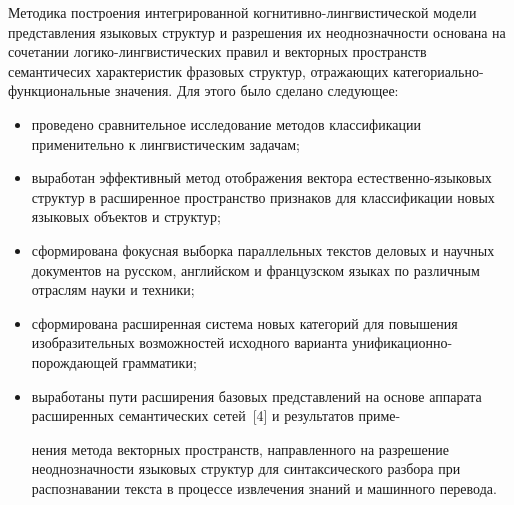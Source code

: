 \begin{multicols}{2}
Методика построения интегрированной ког\-ни\-тив\-но-линг\-ви\-сти\-че\-ской модели 
представления языковых структур и разрешения их неоднозначности 
основана на сочетании ло\-ги\-ко-линг\-ви\-сти\-че\-ских правил и векторных 
пространств семантичесих характеристик фразовых структур, отражающих 
ка\-те\-го\-ри\-аль\-но-функ\-ци\-о\-наль\-ные значения. Для этого было сделано
следующее:
\begin{itemize}
\item 
проведено 
сравнительное исследование методов классификации применительно к 
лингвистическим задачам;\\[-13pt] 
\item выработан эффективный метод отображения 
вектора естест\-вен\-но-язы\-ко\-вых структур в расширенное пространство 
признаков для классификации новых языковых объектов и структур;\\[-13pt]  
\item сформирована фокусная выборка параллельных текстов деловых и научных 
документов на русском, английском и французском языках по различным 
отраслям науки и техники;\\[-13pt]  
\item сформирована расширенная система новых 
категорий для повышения изобразительных возможностей исходного 
варианта уни\-фи\-ка\-ци\-он\-но-по\-рож\-да\-ющей грамматики;\\[-13pt]  
\item выработаны 
пути расширения базовых представлений на основе аппарата расширенных
семантических сетей~[4] и результатов приме-\linebreak\vspace*{-12pt}

\pagebreak

\noindent 
нения метода векторных 
пространств, на\-прав\-лен\-но\-го на разрешение неоднозначности языковых 
структур для синтаксического разбора при распознавании текста в процессе 
извлечения знаний и машинного перевода.\\[-13pt] 
\end{itemize}
  

\end{multicols}
